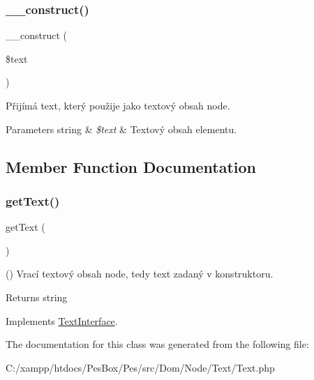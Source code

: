 \subsubsection{\texorpdfstring{\+\_\+\+\_\+construct()}{\_\_construct()}}
{\footnotesize\ttfamily \+\_\+\+\_\+construct (\begin{DoxyParamCaption}\item[{}]{\$text }\end{DoxyParamCaption})}

Přijímá text, který použije jako textový obsah node. 
\begin{DoxyParams}[1]{Parameters}
string & {\em \$text} & Textový obsah elementu. \\
\hline
\end{DoxyParams}


\subsection{Member Function Documentation}
\mbox{\label{class_pes_1_1_dom_1_1_node_1_1_text_1_1_text_a8a2999b1d846c0a7bc77187e28facd99}} 
\subsubsection{\texorpdfstring{get\+Text()}{getText()}}
{\footnotesize\ttfamily get\+Text (\begin{DoxyParamCaption}{ }\end{DoxyParamCaption})}

() Vrací textový obsah node, tedy text zadaný v konstruktoru. \begin{DoxyReturn}{Returns}
string 
\end{DoxyReturn}


Implements \mbox{\hyperlink{interface_pes_1_1_dom_1_1_node_1_1_text_1_1_text_interface}{Text\+Interface}}.



The documentation for this class was generated from the following file\+:\begin{DoxyCompactItemize}
\item 
C\+:/xampp/htdocs/\+Pes\+Box/\+Pes/src/\+Dom/\+Node/\+Text/Text.\+php\end{DoxyCompactItemize}
